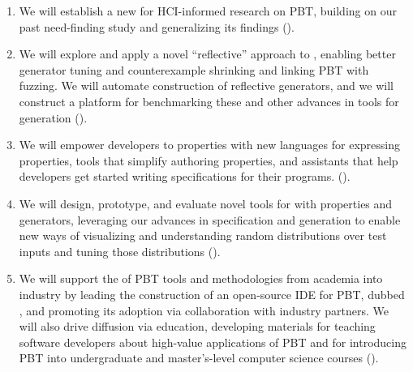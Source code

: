 \begin{enumerate}[noitemsep]
\item We will establish a new  for HCI-informed
research on PBT, building on our past need-finding study and
generalizing its findings ().
%
\item We will explore and apply a novel ``reflective'' approach to
, enabling better generator tuning and counterexample
shrinking and linking PBT with fuzzing.  We will automate construction
of reflective generators, and we will construct a platform for
benchmarking these and other advances in tools for generation ().

%
\item We will empower developers to  properties with new
languages for expressing properties, tools that simplify authoring
properties, and assistants that help developers get started writing
specifications for their programs.
().
%
\item We will design, prototype, and evaluate novel tools for
 with properties
and generators, leveraging our advances in specification and generation to
enable new ways of visualizing and understanding random distributions
    over test inputs and tuning those distributions
().
%
\item We will support the  of PBT tools and
methodologies from academia into industry by
leading the construction of
    an open-source IDE for PBT,
    dubbed \tyche, and promoting its adoption via
    collaboration with industry partners.
We will also drive diffusion via education, developing materials for teaching
software developers about high-value applications of PBT and
for introducing PBT into undergraduate and master's-level computer science courses
().
\end{enumerate}

